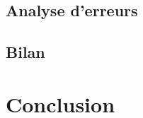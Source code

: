     \subsection{Analyse d'erreurs}
    \label{subsec:main-automatic_keyphrase_annotation-supervised_automatic_keyphrase_annotation-error_analysis}

    \subsection{Bilan}
    \label{subsec:main-automatic_keyphrase_annotation-supervised_automatic_keyphrase_annotation-conclusion}


  \section{Conclusion}
  \label{sec:main-automatic_keyphrase_annotation-conclusion}

